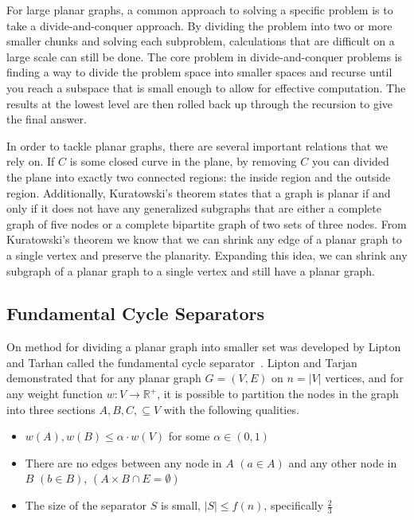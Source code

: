 \documentclass[12pt]{article}
\begin{document}
    For large planar graphs, a common approach to solving a specific problem is to take a divide-and-conquer approach. By dividing the problem into two or more smaller chunks and solving each subproblem, calculations that are difficult on a large scale can still be done. The core problem in divide-and-conquer problems is finding a way to divide the problem space into smaller spaces and recurse until you reach a subspace that is small enough to allow for effective computation. The results at the lowest level are then rolled back up through the recursion to give the final answer.

    In order to tackle planar graphs, there are several important relations that we rely on. If $C$ is some closed curve in the plane, by removing $C$ you can divided the plane into exactly two connected regions: the inside region and the outside region. Additionally, Kuratowski's theorem states that a graph is planar if and only if it does not have any generalized subgraphs that are either a complete graph of five nodes or a complete bipartite graph of two sets of three nodes. From Kuratowski's theorem we know that we can shrink any edge of a planar graph to a single vertex and preserve the planarity. Expanding this idea, we can shrink any subgraph of a planar graph to a single vertex and still have a planar graph.


    \subsection{Fundamental Cycle Separators}
    \label{sec:graph-sep-fund-cycle-sep}

    On method for dividing a planar graph into smaller set was developed by Lipton and Tarhan called the fundamental cycle separator~\cite{lipton1979separator}. Lipton and Tarjan demonstrated that for any planar graph $G = (V,E)$ on $n = |V|$ vertices, and for any weight function $w: V \rightarrow \mathbb{R}^+$, it is possible to partition the nodes in the graph into three sections $A, B, C, \subseteq V$ with the following qualities.
    \begin{itemize}
        \item $w(A), w(B) \leq \alpha \cdot w(V)$ for some $\alpha \in (0,1)$

        \item There are no edges between any node in $A$ $(a \in A)$ and any other node in $B$ $(b \in B)$, $(A \times B \cap E = \emptyset)$

        \item The size of the separator $S$ is small, $|S| \leq f(n)$, specifically $\frac{2}{3}$
    \end{itemize}
\end{document}
